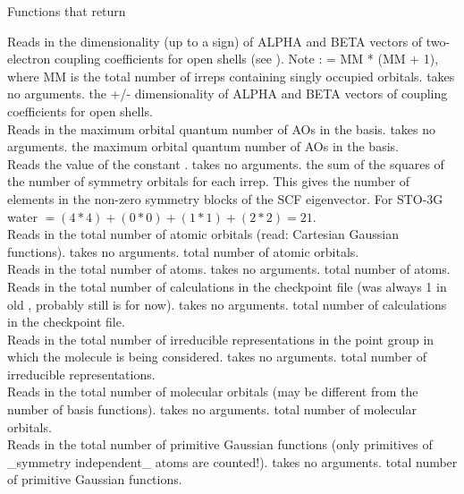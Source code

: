\begin{center}
Functions that return 
\end{center}
{Reads in the dimensionality (up to a sign) of ALPHA and BETA vectors of 
two-electron coupling coefficients for open shells (see 
).
Note :  = MM * (MM + 1), where MM is the total number of
irreps containing singly occupied orbitals.}
{takes no arguments.}
{the +/- dimensionality of ALPHA and BETA vectors of 
coupling coefficients for open shells.} \\
{Reads in the maximum orbital quantum number of AOs in the basis.}
{takes no arguments.}
{the maximum orbital quantum number of AOs in the basis.} \\
{Reads the value of the constant .}
{takes no arguments.}
{the sum of the squares of the number of symmetry
orbitals for each irrep.  This gives the number of elements in the
non-zero symmetry blocks of the SCF eigenvector.  For STO-3G water
$ = (4*4) + (0*0) + (1*1) + (2*2) = 21$.} \\
{Reads in the total number of atomic orbitals (read: Cartesian Gaussian 
functions).}
{takes no arguments.}
{total number of atomic orbitals.} \\
{Reads in the total number of atoms.}
{takes no arguments.}
{total number of atoms.} \\
{Reads in the total number of calculations in the checkpoint file
(was always 1 in old , probably still is for now).}
{takes no arguments.}
{total number of calculations in the checkpoint file.} \\
{Reads in the total number of irreducible representations
in the point group in which the molecule is being considered.}
{takes no arguments.}
{total number of irreducible representations.} \\
{Reads in the total number of molecular orbitals (may be different
from the number of basis functions).}
{takes no arguments.}
{total number of molecular orbitals.} \\
{Reads in the total number of primitive Gaussian functions 
(only primitives of \_symmetry independent\_ atoms are counted!).}
{takes no arguments.}
{total number of primitive Gaussian functions.} \\
